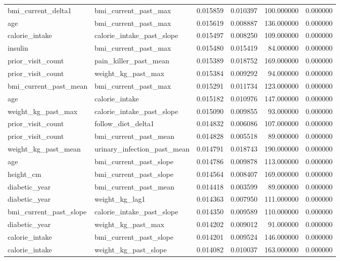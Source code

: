 \begin{longtable}{llrrrr}
bmi\_current\_delta1 & bmi\_current\_past\_max & 0.015859 & 0.010397 & 100.000000 & 0.000000 \\
age & bmi\_current\_past\_max & 0.015619 & 0.008887 & 136.000000 & 0.000000 \\
calorie\_intake & calorie\_intake\_past\_slope & 0.015497 & 0.008250 & 109.000000 & 0.000000 \\
insulin & bmi\_current\_past\_max & 0.015480 & 0.015419 & 84.000000 & 0.000000 \\
prior\_visit\_count & pain\_killer\_past\_mean & 0.015389 & 0.018752 & 169.000000 & 0.000000 \\
prior\_visit\_count & weight\_kg\_past\_max & 0.015384 & 0.009292 & 94.000000 & 0.000000 \\
bmi\_current\_past\_mean & bmi\_current\_past\_max & 0.015291 & 0.011734 & 123.000000 & 0.000000 \\
age & calorie\_intake & 0.015182 & 0.010976 & 147.000000 & 0.000000 \\
weight\_kg\_past\_max & calorie\_intake\_past\_slope & 0.015090 & 0.009855 & 93.000000 & 0.000000 \\
prior\_visit\_count & follow\_diet\_delta1 & 0.014832 & 0.006086 & 107.000000 & 0.000000 \\
prior\_visit\_count & bmi\_current\_past\_mean & 0.014828 & 0.005518 & 89.000000 & 0.000000 \\
weight\_kg\_past\_mean & urinary\_infection\_past\_mean & 0.014791 & 0.018743 & 190.000000 & 0.000000 \\
age & bmi\_current\_past\_slope & 0.014786 & 0.009878 & 113.000000 & 0.000000 \\
height\_cm & bmi\_current\_past\_slope & 0.014564 & 0.008407 & 169.000000 & 0.000000 \\
diabetic\_year & bmi\_current\_past\_mean & 0.014418 & 0.003599 & 89.000000 & 0.000000 \\
diabetic\_year & weight\_kg\_lag1 & 0.014363 & 0.007950 & 111.000000 & 0.000000 \\
bmi\_current\_past\_slope & calorie\_intake\_past\_slope & 0.014350 & 0.009589 & 110.000000 & 0.000000 \\
diabetic\_year & weight\_kg\_past\_max & 0.014202 & 0.009012 & 91.000000 & 0.000000 \\
calorie\_intake & bmi\_current\_past\_slope & 0.014201 & 0.009524 & 146.000000 & 0.000000 \\
calorie\_intake & weight\_kg\_past\_slope & 0.014082 & 0.010037 & 163.000000 & 0.000000 \\

\end{longtable}
